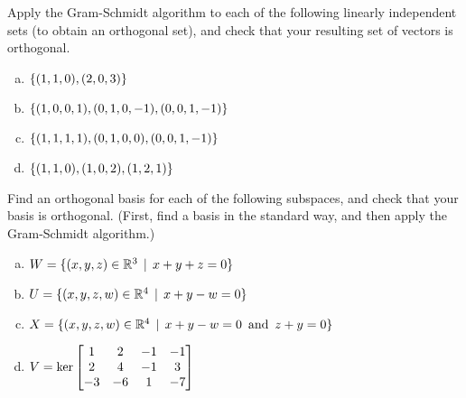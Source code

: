 \begin{prob}
\end{prob} \begin{prob} \label{prob19.3} Apply the Gram-Schmidt algorithm  to each of the following linearly independent sets (to obtain an orthogonal set), and check that your resulting set of vectors is orthogonal.
\medskip
\begin{enumerate}[a)]
\item $\{(1,1,0),(2,0,3) \}$
\medskip
%
\item\sov $\{(1, 0, 0, 1),(0, 1, 0, -1),(0, 0, 1, -1) \}$
\medskip
%
\item $\{(1, 1, 1, 1),(0, 1, 0, 0),(0, 0, 1, -1) \}$
\medskip
%
\item\sov $\{(1, 1, 0),(1, 0, 2),(1, 2, 1) \}$
\medskip
%
\end{enumerate}
\end{prob} \begin{prob} \label{prob19.4} Find an orthogonal basis for each of the following subspaces, and check that your basis is orthogonal. (First, find a basis in the standard way, and then apply the Gram-Schmidt algorithm.)
\medskip
\begin{enumerate}[a)]
\item $W=\{(x,y,z)\in\mathbb{R}^3 \,\mid \, x+y+z=0 \}$
\medskip
%
\item\sov 
 $U=\{(x,y,z, w)\in\mathbb{R}^4 \,\mid \, x+y-w=0 \}$\medskip
%
\item $X=\{(x,y,z, w)\in\mathbb{R}^4 \,\mid \, x+y-w=0 \, \text{ and } \, z+y=0 \}$
\medskip
%
\item\sov $V=\ker \bmatrix 1 & 2 & -1 & -1 \\
 2 & 4 & -1 & 3 \\
 -3 & -6 & 1 & -7 \endbmatrix$
\medskip
%
\end{enumerate}


\end{prob}
